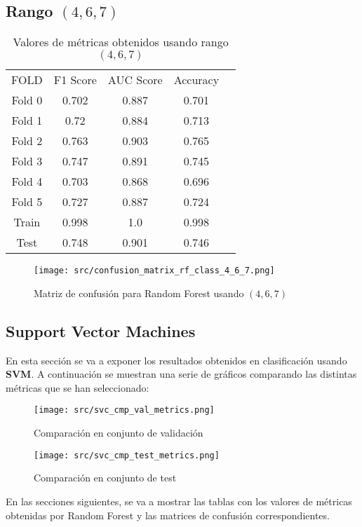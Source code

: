 \subsection*{Rango $(4,6,7)$}
\begin{table}[H]
	\centering
	\begin{tabular}{|c|c|c|c|c}
		\cline{1-4}
		FOLD   & F1 Score & AUC Score & Accuracy \\ \cline{1-4}
		Fold 0 & 0.702    & 0.887     & 0.701    \\  \cline{1-4}
		Fold 1 & 0.72     & 0.884     & 0.713    \\  \cline{1-4}
		Fold 2 & 0.763    & 0.903     & 0.765    \\  \cline{1-4}
		Fold 3 & 0.747    & 0.891     & 0.745    \\  \cline{1-4}
		Fold 4 & 0.703    & 0.868     & 0.696    \\  \cline{1-4}
		Fold 5 & 0.727    & 0.887     & 0.724    \\  \cline{1-4}
		Train  & 0.998    & 1.0       & 0.998    \\ \cline{1-4}
		Test   & 0.748    & 0.901     & 0.746    \\ \cline{1-4}
	\end{tabular}
	\caption{Valores de métricas obtenidos usando rango $(4,6,7)$}
\end{table}
\begin{figure}[H]
	\centering
	\texttt{[image: src/confusion\_matrix\_rf\_class\_4\_6\_7.png]}
	\caption{Matriz de confusión para Random Forest usando $(4,6,7)$}
	\label{fig:confusion_matrix_rf2}
\end{figure}
\pagebreak
\subsection{Support Vector Machines}
En esta sección se va a exponer los resultados obtenidos en clasificación usando \textbf{SVM}.
A continuación se muestran una serie de gráficos comparando las distintas métricas que se han seleccionado:
\begin{figure}[H]
	\centering
	\texttt{[image: src/svc\_cmp\_val\_metrics.png]}
	\caption{Comparación en conjunto de validación}
	\label{fig:svc_class_cmp_val}
\end{figure}

\begin{figure}[H]
	\centering
	\texttt{[image: src/svc\_cmp\_test\_metrics.png]}
	\caption{Comparación en conjunto de test}
	\label{fig:svc_class_cmp_test}
\end{figure}
En las secciones siguientes, se va a mostrar las tablas con los valores de métricas obtenidas por Random Forest y las matrices de confusión correspondientes.
